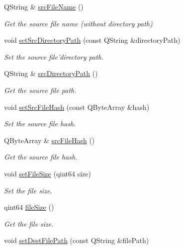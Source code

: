 \begin{DoxyCompactItemize}
Q\-String \& \hyperlink{classmdt_file_copier_item_a0bfdb3814bb1e9cea33bdd7826c03d76}{src\-File\-Name} ()
\begin{DoxyCompactList}\small\item\em Get the source file name (without directory path) \end{DoxyCompactList}\item 
void \hyperlink{classmdt_file_copier_item_a68310720d1cfeba70a616d81d12a9cde}{set\-Src\-Directory\-Path} (const Q\-String \&directory\-Path)
\begin{DoxyCompactList}\small\item\em Set the source file'directory path. \end{DoxyCompactList}\item 
Q\-String \& \hyperlink{classmdt_file_copier_item_a2faf98128145c5ff1df336d0d5d91f47}{src\-Directory\-Path} ()
\begin{DoxyCompactList}\small\item\em Get the source file path. \end{DoxyCompactList}\item 
void \hyperlink{classmdt_file_copier_item_a5b8521d3acf4adffaf64f7dd5b2736b0}{set\-Src\-File\-Hash} (const Q\-Byte\-Array \&hash)
\begin{DoxyCompactList}\small\item\em Set the source file hash. \end{DoxyCompactList}\item 
Q\-Byte\-Array \& \hyperlink{classmdt_file_copier_item_a0e8428a98488cb21aa47eb4f05dabf49}{src\-File\-Hash} ()
\begin{DoxyCompactList}\small\item\em Get the source file hash. \end{DoxyCompactList}\item 
void \hyperlink{classmdt_file_copier_item_a6509cd06e9d1b27d9a7ecf3a384fe673}{set\-File\-Size} (qint64 size)
\begin{DoxyCompactList}\small\item\em Set the file size. \end{DoxyCompactList}\item 
qint64 \hyperlink{classmdt_file_copier_item_af0bb0ba7fd66473472f55695414519b7}{file\-Size} ()
\begin{DoxyCompactList}\small\item\em Get the file size. \end{DoxyCompactList}\item 
void \hyperlink{classmdt_file_copier_item_ab6155e256fe82b65f65c1c0519090d0a}{set\-Dest\-File\-Path} (const Q\-String \&file\-Path)

\end{DoxyCompactItemize}
